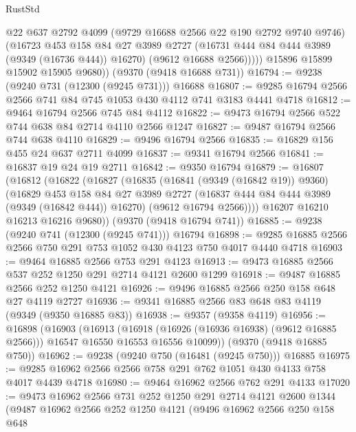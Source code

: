 \begin{lexlean}{RustStd}
\begin{coremodule}
              @22
              @637
              @2792
              @4099
              (@9729 @16688 @2566 @22 @190 @2792 @9740 @9746)
              (@16723
                @453
                @158
                @84
                @27
                @3989
                @2727
                (@16731 @444 @84 @444 @3989 (@9349 (@16736 @444)) @16270)
                (@9612 @16688 @2566)))))
        @15896
        @15899
        @15902
        @15905
        @9680))
    (@9370 (@9418 @16688 @731))
@16794 := @9238 (@9240 @731 (@12300 (@9245 @731))) @16688
@16807 := @9285 @16794 @2566 @2566 @741 @84 @745 @1053 @430 @4112 @741 @3183 @4441 @4718
@16812 := @9464 @16794 @2566 @745 @84 @4112
@16822 := @9473 @16794 @2566 @522 @744 @638 @84 @2714 @4110 @2566 @1247
@16827 := @9487 @16794 @2566 @744 @638 @4110
@16829 := @9496 @16794 @2566
@16835 := @16829 @156 @455 @24 @637 @2711 @4099
@16837 := @9341 @16794 @2566
@16841 := @16837 @19 @24 @19 @2711
@16842 := @9350 @16794
@16879 := @16807
    (@16812
      (@16822
        (@16827
          (@16835
            (@16841 (@9349 (@16842 @19)) @9360)
            (@16829
              @453
              @158
              @84
              @27
              @3989
              @2727
              (@16837 @444 @84 @444 @3989 (@9349 (@16842 @444)) @16270)
              (@9612 @16794 @2566))))
        @16207
        @16210
        @16213
        @16216
        @9680))
    (@9370 (@9418 @16794 @741))
@16885 := @9238 (@9240 @741 (@12300 (@9245 @741))) @16794
@16898 := @9285 @16885 @2566 @2566 @750 @291 @753 @1052 @430 @4123 @750 @4017 @4440 @4718
@16903 := @9464 @16885 @2566 @753 @291 @4123
@16913 := @9473 @16885 @2566 @537 @252 @1250 @291 @2714 @4121 @2600 @1299
@16918 := @9487 @16885 @2566 @252 @1250 @4121
@16926 := @9496 @16885 @2566 @250 @158 @648 @27 @4119 @2727
@16936 := @9341 @16885 @2566 @83 @648 @83 @4119 (@9349 (@9350 @16885 @83))
@16938 := @9357 (@9358 @4119)
@16956 := @16898
    (@16903
      (@16913
        (@16918 (@16926 (@16936 @16938) (@9612 @16885 @2566)))
        @16547
        @16550
        @16553
        @16556
        @10099))
    (@9370 (@9418 @16885 @750))
@16962 := @9238 (@9240 @750 (@16481 (@9245 @750))) @16885
@16975 := @9285 @16962 @2566 @2566 @758 @291 @762 @1051 @430 @4133 @758 @4017 @4439 @4718
@16980 := @9464 @16962 @2566 @762 @291 @4133
@17020 := @9473
    @16962
    @2566
    @731
    @252
    @1250
    @291
    @2714
    @4121
    @2600
    @1344
    (@9487
      @16962
      @2566
      @252
      @1250
      @4121
      (@9496
        @16962
        @2566
        @250
        @158
        @648

\end{coremodule}
\end{lexlean}
